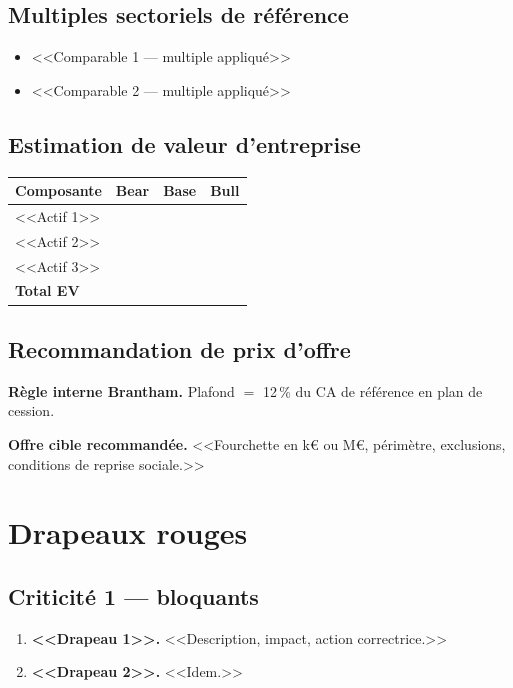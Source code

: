\documentclass[11pt,a4paper]{article}
\begin{document}
\subsection{Multiples sectoriels de référence}

\begin{itemize}[leftmargin=2em]
  \item <<Comparable 1 --- multiple appliqué>>
  \item <<Comparable 2 --- multiple appliqué>>
\end{itemize}

\subsection{Estimation de valeur d'entreprise}

\begin{tabular}{lrrr}
\toprule
Composante & Bear & Base & Bull \\
\midrule
<<Actif 1>> & & & \\
<<Actif 2>> & & & \\
<<Actif 3>> & & & \\
\midrule
\textbf{Total EV} & & & \\
\bottomrule
\end{tabular}

\subsection{Recommandation de prix d'offre}

\textbf{Règle interne Brantham.} Plafond \(=\) 12\,\% du CA de référence en
plan de cession.

\textbf{Offre cible recommandée.} <<Fourchette en k\euro{} ou M\euro{}, périmètre,
exclusions, conditions de reprise sociale.>>

\section{Drapeaux rouges}

\subsection{Criticité 1 --- bloquants}

\begin{enumerate}[leftmargin=2em]
  \item \textbf{<<Drapeau 1>>.} <<Description, impact, action correctrice.>>
  \item \textbf{<<Drapeau 2>>.} <<Idem.>>
\end{enumerate}
\end{document}
